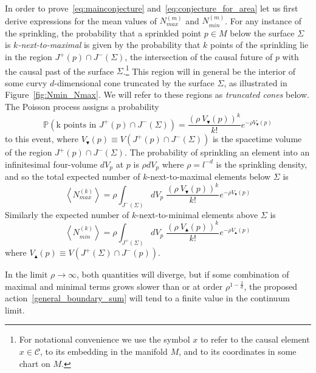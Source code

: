 \documentclass[12pt]{article}
\newcommand{\be}{\begin{equation}}
\newcommand{\ee}{\end{equation}}
\begin{document}
In order to prove~\eqref{eq:mainconjecture} and~\eqref{eq:conjecture_for_area} let us first derive expressions for the mean values of $N_{max}^{(m)}$ and $N_{min}^{(m)}$. For any instance of the sprinkling, the probability that a sprinkled point $p\in M$ below the surface $\Sigma$ is $k$\emph{-next-to-maximal} is given by the probability that $k$ points of the sprinkling lie in the region $J^{+}(p)\cap J^{-}(\Sigma)$, the intersection of the causal future of $p$ with the causal past of the surface $\Sigma$.\footnote{For notational convenience we use the symbol $x$ to refer to the causal element $x\in\mathcal C$, to its embedding in the manifold $M$, and to its coordinates in some chart on $M$.} This region will in general be the interior of some curvy $d$-dimensional cone truncated by the surface $\Sigma$, as illustrated in Figure~\ref{fig:Nmin_Nmax}. We will refer to these regions as \emph{truncated cones} below. The Poisson process assigns a probability
\be\label{Poisson}
\mathbb P\left(\text{k points in }J^{+}(p)\cap J^{-}(\Sigma)\right)=\frac{\left(\rho\: V_\blacktriangledown(p)\right)^k}{k!}e^{-\rho V_\blacktriangledown(p)}
\ee
to this event, where $V_\blacktriangledown(p)\equiv V(J^{+}(p)\cap J^{-}(\Sigma))$ is the spacetime volume of the region $J^{+}(p)\cap J^{-}(\Sigma)$. The probability of sprinkling an element into an infinitesimal four-volume $dV_p$ at $p$ is $\rho dV_p$ where $\rho=l^{-d}$ is the sprinkling density, and so the total expected number of $k$-next-to-maximal elements below $\Sigma$ is
\be\label{eq:nmax}
\left\langle N_{max}^{(k)}\right\rangle =\rho\int_{J^{-}(\Sigma)}dV_p\; \frac{\left(\rho\: V_\blacktriangledown(p)\right)^k}{k!}e^{-\rho V_\blacktriangledown(p)}
\ee
Similarly the expected number of $k$-next-to-minimal elements above $\Sigma$ is
\be\label{eq:nmin}
\left\langle N_{min}^{(k)}\right\rangle =\rho\int_{J^{+}(\Sigma)}dV_p\; \frac{\left(\rho\: V_\blacktriangle(p)\right)^k}{k!}e^{-\rho V_\blacktriangle(p)}
\ee
where $V_\blacktriangle(p)\equiv V(J^{+}(\Sigma)\cap J^{-}(p))$.

In the limit $\rho\rightarrow\infty$, both quantities will diverge, but if some combination of maximal and minimal terms grows slower than or at order $\rho^{1-\frac2d}$, the proposed action~\eqref{general_boundary_sum} will tend to a finite value in the continuum limit.
\end{document}
